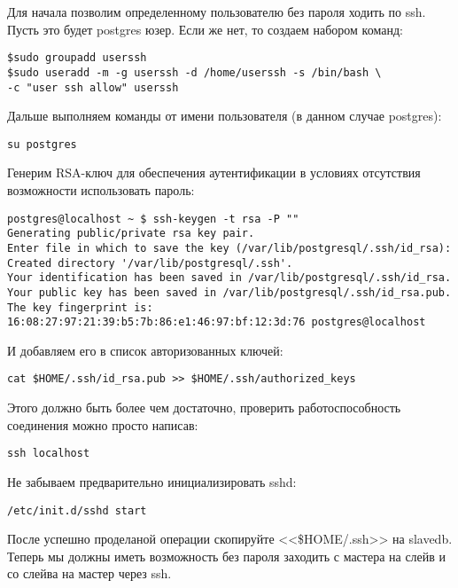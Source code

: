 Для начала позволим определенному пользователю без пароля ходить по ssh. Пусть это будет postgres юзер. 
Если же нет, то создаем набором команд:
\begin{lstlisting}[label=lst:streaming1,caption=Создаем пользователя userssh]
$sudo groupadd userssh
$sudo useradd -m -g userssh -d /home/userssh -s /bin/bash \
-c "user ssh allow" userssh
\end{lstlisting}

Дальше выполняем команды от имени пользователя (в данном случае postgres):
\begin{lstlisting}[label=lst:streaming2,caption=Логинимся под пользователем postgres]
su postgres
\end{lstlisting}

Генерим RSA-ключ для обеспечения аутентификации в условиях отсутствия возможности использовать пароль:
\begin{lstlisting}[label=lst:streaming3,caption=Генерим RSA-ключ]
postgres@localhost ~ $ ssh-keygen -t rsa -P ""
Generating public/private rsa key pair.
Enter file in which to save the key (/var/lib/postgresql/.ssh/id_rsa): 
Created directory '/var/lib/postgresql/.ssh'.
Your identification has been saved in /var/lib/postgresql/.ssh/id_rsa.
Your public key has been saved in /var/lib/postgresql/.ssh/id_rsa.pub.
The key fingerprint is:
16:08:27:97:21:39:b5:7b:86:e1:46:97:bf:12:3d:76 postgres@localhost
\end{lstlisting}

И добавляем его в список авторизованных ключей:
\begin{lstlisting}[label=lst:streaming4,caption=Добавляем его в список авторизованных ключей]
cat $HOME/.ssh/id_rsa.pub >> $HOME/.ssh/authorized_keys
\end{lstlisting}

Этого должно быть более чем достаточно, проверить работоспособность соединения можно просто написав:
\begin{lstlisting}[label=lst:streaming5,caption=Пробуем зайти на ssh без пароля]
ssh localhost
\end{lstlisting}

Не забываем предварительно инициализировать sshd:
\begin{lstlisting}[label=lst:streaming6,caption=Запуск sshd]
/etc/init.d/sshd start
\end{lstlisting}

После успешно проделаной операции скопируйте <<\$HOME/.ssh>> на slavedb. 
Теперь мы должны иметь возможность без пароля заходить с мастера на слейв и со слейва на мастер через ssh.

